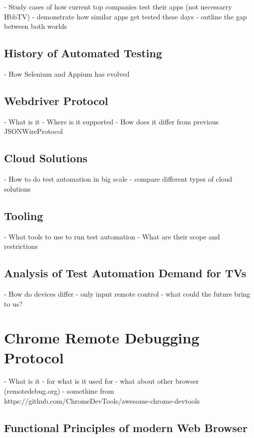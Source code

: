 - Study cases of how current top companies test their apps (not necessarry HbbTV)
- demonstrate how similar apps get tested these days
- outline the gap between both worlds

\subsection{History of Automated Testing\label{sec:history}}

- How Selenium and Appium has evolved

\subsection{Webdriver Protocol\label{sec:webdriver}}

- What is it
- Where is it supported
- How does it differ from previous JSONWireProtocol

\subsection{Cloud Solutions\label{sec:cloud}}

- How to do test automation in big scale
- compare different types of cloud solutions

\subsection{Tooling\label{sec:tooling}}

- What tools to use to run test automation
- What are their scope and restrictions

\subsection{Analysis of Test Automation Demand for TVs\label{sec:testautomationontv}}

- How do devices differ
- only input remote control
- what could the future bring to us?

\section{Chrome Remote Debugging Protocol}

- What is it
- for what is it used for
- what about other browser (remotedebug.org)
- somethine from https://github.com/ChromeDevTools/awesome-chrome-devtools

\subsection{Functional Principles of modern Web Browser\label{sec:howbrowserwork}}


